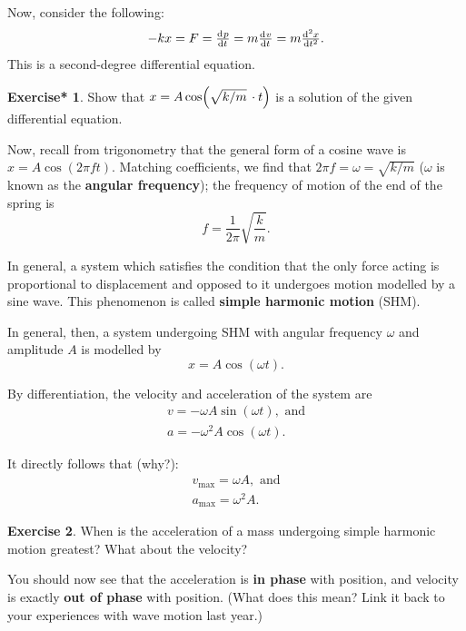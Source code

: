 \documentclass[a4paper]{amsbook}
\newcommand{\marginsymbol}{}
\theoremstyle{definition}
\newtheorem{exercise}{Exercise}
\numberwithin{exercise}{chapter}
\newtheorem{exercise*}[exercise]{Exercise*}
\numberwithin{exercise}{chapter}
\begin{document}
\marginsymbol Now, consider the following:
\begin{displaymath}
  -kx = F = \od{p}{t} = m \od{v}{t} = m\od[2]{x}{t}.
\end{displaymath}
This is a second-degree differential equation.

\begin{exercise*}
  Show that $ x = A \cos(\sqrt{k/m} \thinspace\cdot t) $ is a solution of the given differential equation.
\end{exercise*}

Now, recall from trigonometry that the general form of a cosine wave is $ x = A \cos(2\pi f t) $. Matching coefficients,
we find that $ 2\pi f = \omega = \sqrt{k/m} $ ($ \omega $ is known as the \textbf{angular frequency}); the frequency of
motion of the end of the spring is
\begin{equation}
  f = \frac{1}{2\pi} \sqrt{\frac{k}{m}}.
\end{equation}

In general, a system which satisfies the condition that the only force acting is proportional to displacement and opposed to
it undergoes motion modelled by a sine wave. This phenomenon is called \textbf{simple harmonic motion} (SHM).

In general, then, a system undergoing SHM with angular frequency $ \omega $ and amplitude $ A $ is modelled by
\begin{equation}
  x = A \cos (\omega t).
\end{equation}

By differentiation, the velocity and acceleration of the system are
\begin{gather}
  v = -\omega A \sin (\omega t), \text{ and}\\
  a = -\omega^2 A \cos (\omega t).
\end{gather}

It directly follows that (why?):
\begin{gather}
  v_\text{max} = \omega A, \text{ and}\\
  a_\text{max} = \omega^2 A.
\end{gather}

\begin{exercise}
  When is the acceleration of a mass undergoing simple harmonic motion greatest? What about the velocity?
\end{exercise}

You should now see that the acceleration is \textbf{in phase} with position, and velocity is exactly \textbf{out of phase}
with position. (What does this mean? Link it back to your experiences with wave motion last year.)
\end{document}
